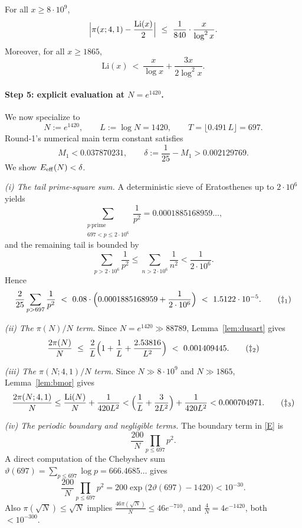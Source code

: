 \begin{lemma}\label{lem:bmor}
For all $x\ge 8\cdot 10^9$,
\[
\Bigl|\pi(x;4,1)-\frac{\mathrm{Li}(x)}{2}\Bigr|
\ \le\ \frac{1}{840}\cdot \frac{x}{\log^2 x}.
\]
Moreover, for all $x\ge 1865$,
\[
\mathrm{Li}(x)\ <\ \frac{x}{\log x}+\frac{3x}{2\log^2 x}.
\]
\end{lemma}

\paragraph{Step 5: explicit evaluation at $N=e^{1420}$.}
We now specialize to
\[
N:=e^{1420},\qquad L:=\log N=1420,\qquad T=\lfloor 0.491\,L\rfloor=697.
\]
Round-1's numerical main term constant satisfies
\[
M_1<0.037870231,
\qquad
\delta:=\frac{1}{25}-M_1>0.002129769.
\tag{$\dagger$}
\]
We show $E_{\rm eff}(N)<\delta$.

\medskip
\noindent\emph{(i) The tail prime-square sum.}
A deterministic sieve of Eratosthenes up to $2\cdot 10^6$ yields
\[
\sum_{\substack{p\ \mathrm{prime}\\ 697<p\le 2\cdot 10^6}}\frac{1}{p^2}=0.0001885168959\ldots,
\]
and the remaining tail is bounded by
\[
\sum_{p>2\cdot 10^6}\frac1{p^2}\le \sum_{n>2\cdot 10^6}\frac1{n^2}<\frac{1}{2\cdot 10^6}.
\]
Hence
\[
\frac{2}{25}\sum_{p>697}\frac1{p^2}\ <\ 0.08\cdot\Bigl(0.0001885168959+\frac1{2\cdot 10^6}\Bigr)
\ <\ 1.5122\cdot 10^{-5}.
\tag{$\ddagger_1$}
\]

\medskip
\noindent\emph{(ii) The $\pi(N)/N$ term.}
Since $N=e^{1420}\gg 88789$, Lemma~\ref{lem:dusart} gives
\[
\frac{2\pi(N)}{N}\ \le\ \frac{2}{L}\Bigl(1+\frac{1}{L}+\frac{2.53816}{L^2}\Bigr)
\ <\ 0.001409445.
\tag{$\ddagger_2$}
\]

\medskip
\noindent\emph{(iii) The $\pi(N;4,1)/N$ term.}
Since $N\gg 8\cdot 10^9$ and $N\gg 1865$, Lemma~\ref{lem:bmor} gives
\[
\frac{2\pi(N;4,1)}{N}
\le \frac{\mathrm{Li}(N)}{N}+\frac{1}{420L^2}
< \Bigl(\frac{1}{L}+\frac{3}{2L^2}\Bigr)+\frac{1}{420L^2}
< 0.000704971.
\tag{$\ddagger_3$}
\]

\medskip
\noindent\emph{(iv) The periodic boundary and negligible terms.}
The boundary term in \eqref{E} is
\[
\frac{200}{N}\prod_{p\le 697}p^2.
\]
A direct computation of the Chebyshev sum $\vartheta(697)=\sum_{p\le 697}\log p=666.4685\ldots$ gives
\[
\frac{200}{N}\prod_{p\le 697}p^2
=200\exp\bigl(2\vartheta(697)-1420\bigr)
< 10^{-30}.
\tag{$\ddagger_4$}
\]
Also $\pi(\sqrt N)\le \sqrt N$ implies $\frac{46\pi(\sqrt N)}{N}\le 46e^{-710}$, and $\frac4N=4e^{-1420}$, both $<10^{-300}$.

